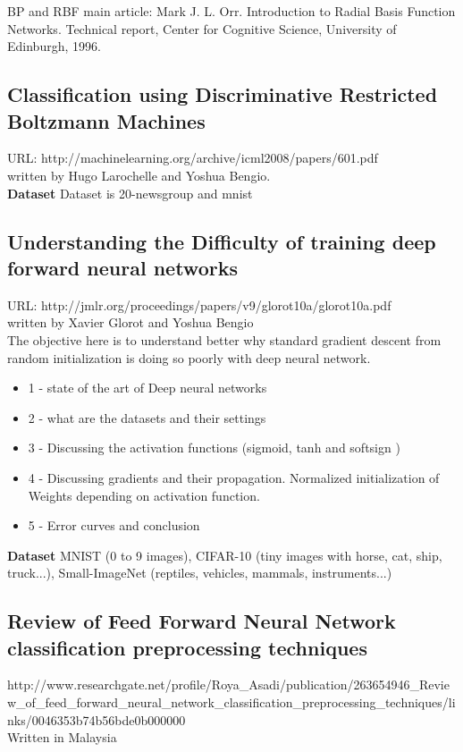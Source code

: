 		BP and RBF main article: Mark J. L. Orr. Introduction to Radial Basis Function Networks. Technical report, Center for Cognitive Science, University of Edinburgh, 1996.


	\subsection{Classification using Discriminative Restricted Boltzmann Machines}
		URL: http://machinelearning.org/archive/icml2008/papers/601.pdf \\
		written by Hugo Larochelle and Yoshua Bengio. \\


		\textbf{Dataset}
		Dataset is 20-newsgroup and mnist

	\subsection{Understanding the Difficulty of training deep forward neural networks}
		URL: http://jmlr.org/proceedings/papers/v9/glorot10a/glorot10a.pdf \\
		written by Xavier Glorot and Yoshua Bengio \\

		The objective here is to understand better why standard gradient descent from random initialization is doing so poorly with deep neural network.
		\begin{itemize}
			\item 1 - state of the art of Deep neural networks
			\item 2 - what are the datasets and their settings
			\item 3 - Discussing the activation functions (sigmoid, tanh and softsign )
			\item 4 - Discussing gradients and their propagation. Normalized initialization of Weights depending on activation function.
			\item 5 - Error curves and conclusion
		\end{itemize}

		\textbf{Dataset}
		MNIST (0 to 9 images), CIFAR-10 (tiny images with horse, cat, ship, truck...), Small-ImageNet (reptiles, vehicles, mammals, instruments...)

		\subsection{Review of Feed Forward Neural Network classification preprocessing techniques }
			http://www.researchgate.net/profile/Roya\_Asadi/publication/263654946\_Review\_of\_feed\_forward\_neural\_network\_classification\_preprocessing\_techniques/links/0046353b74b56bde0b000000\\
			Written in Malaysia\\

